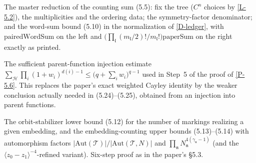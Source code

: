 \begin{lemma}\label{R-decomp}
  \leanok
  The master reduction of the counting sum (5.5): fix the tree
  (\(C^n\) choices by \ref{L-5.2}), the multiplicities and the ordering
  data; the symmetry-factor denominator; and the word-sum bound (5.10)
  in the normalization of \ref{D-ledger}, with
  \(\mathrm{pairedWordSum}\) on the left and
  \(\big(\prod_{\mathfrak l}(m_{\mathfrak l}/2)!/m_{\mathfrak l}!\big)
  \mathrm{paperSum}\) on the right exactly as printed.
\end{lemma}

\begin{lemma}\label{I-cayley}
  \leanok
  The sufficient parent-function injection estimate
  \(\sum_{\mathcal H}\prod_i (1 + w_i)^{d(i)-1}
  \le \big(q + \sum_i w_i\big)^{q-1}\) used in Step~5 of the proof of
  \ref{P-5.6}.  This replaces the paper's exact weighted Cayley identity
  by the weaker conclusion actually needed in (5.24)--(5.25), obtained
  from an injection into parent functions.
\end{lemma}

\begin{proposition}\label{P-5.6}
  \leanok
  The orbit-stabilizer lower bound (5.12) for the number of markings
  realizing a given embedding, and the embedding-counting upper bounds
  (5.13)--(5.14) with automorphism factors
  \(\lvert\mathrm{Aut}(\mathcal{T})\rvert /
  \lvert\mathrm{Aut}(\mathcal{T},N)\rvert\) and
  \(\prod_{\mathfrak n} N_{\mathfrak n}^{4(\gamma_{\mathfrak n}-1)}\)
  (and the \(\langle z_0 - z_1\rangle^{-4}\)-refined variant).
  Six-step proof as in the paper's \S5.3.
\end{proposition}
